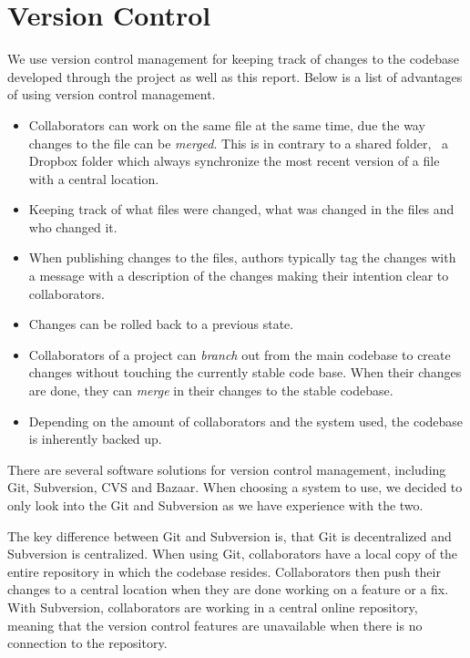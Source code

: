\section{Version Control}
\label{sec:implementation:version-control}

We use version control management for keeping track of changes to the codebase developed through the project as well as this report. Below is a list of advantages of using version control management.

\begin{itemize}
\item Collaborators can work on the same file at the same time, due the way changes to the file can be \emph{merged}. This is in contrary to a shared folder, \eg~a Dropbox folder which always synchronize the most recent version of a file with a central location.
\item Keeping track of what files were changed, what was changed in the files and who changed it.
\item When publishing changes to the files, authors typically tag the changes with a message with a description of the changes making their intention clear to collaborators.
\item Changes can be rolled back to a previous state.
\item Collaborators of a project can \emph{branch} out from the main codebase to create changes without touching the currently stable code base. When their changes are done, they can \emph{merge} in their changes to the stable codebase.
\item Depending on the amount of collaborators and the system used, the codebase is inherently backed up.
\end{itemize}

There are several software solutions for version control management, including Git, Subversion, CVS and Bazaar. When choosing a system to use, we decided to only look into the Git and Subversion as we have experience with the two.

The key difference between Git and Subversion is, that Git is decentralized and Subversion is centralized. When using Git, collaborators have a local copy of the entire repository in which the codebase resides. Collaborators then push their changes to a central location when they are done working on a feature or a fix. With Subversion, collaborators are working in a central online repository, meaning that the version control features are unavailable when there is no connection to the repository.

